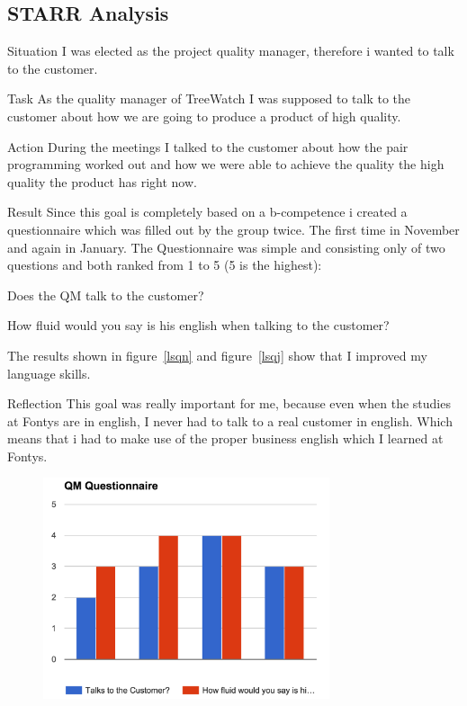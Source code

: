\documentclass[12pt]{article}
\begin{document}
	\subsection{STARR Analysis}
	\begin{STARR}
	    \item[Situation] I was elected as the project quality manager, therefore i wanted to talk to the customer.
	    \item[Task] As the quality manager of TreeWatch I was supposed to talk to the customer about how we are going to produce a product of high quality.
	    \item[Action] During the meetings I talked to the customer about how the pair programming worked out and how we were able to achieve the quality the high quality the product has right now.
	    \item[Result] Since this goal is completely based on a b-competence i created a questionnaire which was filled out by the group twice. The first time in November and again in January.
	    The Questionnaire was simple and consisting only of two questions and both ranked from 1 to 5 (5 is the highest):
	    \begin{L2}
	    \item Does the QM talk to the customer?
	    \item How fluid would you say is his english when talking to the customer?
	    \end{L2}
	    The results shown in figure~\ref{lsqn}  and figure~\ref{lsqj} show that I improved my language skills.
	    \item[Reflection] This goal was really important for me, because even when the studies at Fontys are in english, I never had to talk to a real customer in english. Which means that i had to make use of the proper business english which I learned at Fontys.
	    	\begin{figure}
	    		\centering
	    		\includegraphics[width=0.75\textwidth, keepaspectratio=true]{qmquest1.png}

\end{figure}
\end{STARR}
\end{document}
